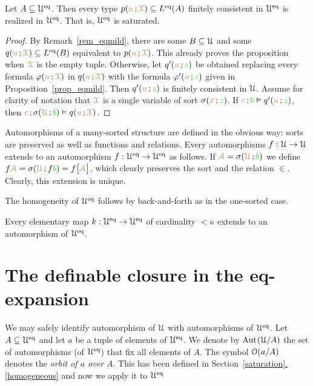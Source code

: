\documentclass[creche.tex]{subfiles}
\begin{document}
\begin{proposition}\label{prop_Ueq_saturated}
Let $A\subseteq\EuScript U^{{\rm eq}}$. Then every type $p({\color{brown} u}\,;{\color{brown}\EuScript X})\subseteq L^{{\rm eq}}(A)$ finitely consistent in $\EuScript U^{{\rm eq}}$ is realized in $\EuScript U^{{\rm eq}}$. That is, $\EuScript U^{{\rm eq}}$ is saturated.
\end{proposition}
\begin{proof}
By Remark~\ref{rem_eqmild}, there are some $B\subseteq\EuScript U$ and some $q({\color{brown} u}\,;{\color{brown}\EuScript X})\subseteq L^{{\rm eq}}(B)$ equivalent to $p({\color{brown} u}\,;{\color{brown}\EuScript X})$. This already proves the proposition when ${\color{brown}\EuScript X}$ is the empty tuple. Otherwise, let $q'({\color{brown} u}\,;{\color{green} z})$ be obtained replacing every formula $\varphi({\color{brown} u}\,;{\color{brown}\EuScript X})$ in $q({\color{brown} u}\,;{\color{brown}\EuScript X})$ with the formula $\varphi'({\color{brown} u}\,;{\color{green} z})$ given in Proposition~\ref{prop_eqmild}. Then $q'({\color{brown} u}\,;{\color{green} z})$ is finitely consistent in $\EuScript U$. Assume for clarity of notation that ${\color{brown}\EuScript X}$ is a single variable of sort $\sigma({\color{brown} x}\,;{\color{green} z})$. If ${\color{brown} c}\,;{\color{green} b}\vDash q'({\color{brown} u}\,;{\color{green} z})$, then  ${\color{brown} c}\,;\sigma({\color{brown}\EuScript U}\,;{\color{green} b})\vDash q({\color{brown} u}\,;{\color{brown}\EuScript X})$.
\end{proof}


Automorphisms of a many-sorted structure are defined in the obvious way: sorts are preserved as well as functions and relations. Every automorphisms $f:\EuScript U\rightarrow\EuScript U$ extends to an automorphism $f:\EuScript U^{{\rm eq}}\rightarrow\EuScript U^{{\rm eq}}$ as follows.  If ${\color{brown}\EuScript A}=\sigma({\color{brown}\EuScript U}\,;{\color{green} b})$ we define $f{\color{brown}\EuScript A}=\sigma({\color{brown}\EuScript U}\,;f{\color{green} b})=f\big[{\color{brown}\EuScript A}\big]$, which clearly preserves the sort and the relation $\in$. Clearly, this extension is unique.

The homogeneity of $\EuScript U^{{\rm eq}}$ follows by back-and-forth as in the one-sorted case.

\begin{proposition}\label{prop_Ueq_homogeneous}
Every elementary map $k:\EuScript U^{{\rm eq}}\to\EuScript U^{{\rm eq}}$ of cardinality $<\kappa$ extends to an automorphism of $\EuScript U^{{\rm eq}}$.\QED
\end{proposition} 




\section{The definable closure in the eq-expansion}
We may safely identify automorphism of $\EuScript U$ with automorphisms of $\EuScript U^{{\rm eq}}$. Let $A\subseteq\EuScript U^{{\rm eq}}$ and let $a$ be a tuple of elements of $\EuScript U^{{{\rm eq}}}$. We denote by \emph{$\textrm{Aut\kern.15ex}(\EuScript U/A)$\/} the set of automorphisms (of $\EuScript U^{{\rm eq}}$) that fix all elements of $A$. The symbol \emph{$\EuScript O(a/A)$\/} denotes the \emph{orbit of $a$ over $A$}. This has been defined in Section~\hyperref[homogeneous]{\ref*{saturation}.\ref*{homogeneous}} and now we apply it to $\EuScript U^{{\rm eq}}$
\end{document}
